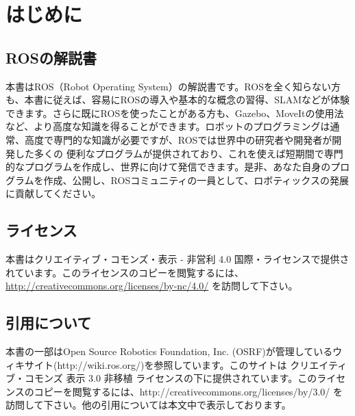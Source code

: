 \chapter*{はじめに}

\section*{ROSの解説書}

本書はROS（Robot Operating System）の解説書です。ROSを全く知らない方も、本書に従えば、容易にROSの導入や基本的な概念の習得、SLAMなどが体験できます。さらに既にROSを使ったことがある方も、Gazebo、MoveItの使用法など、より高度な知識を得ることができます。ロボットのプログラミングは通常、高度で専門的な知識が必要ですが、ROSでは世界中の研究者や開発者が開発した多くの
便利なプログラムが提供されており、これを使えば短期間で専門的なプログラムを作成し、世界に向けて発信できます。是非、あなた自身のプログラムを作成、公開し、ROSコミュニティの一員として、ロボティックスの発展に貢献してください。

\section*{ライセンス}

本書はクリエイティブ・コモンズ・表示 - 非営利 4.0 国際・ライセンスで提供されています。このライセンスのコピーを閲覧するには、 \url{http://creativecommons.org/licenses/by-nc/4.0/} を訪問して下さい。

\section*{引用について}

本書の一部はOpen Source Robotics Foundation, Inc. (OSRF)が管理しているウィキサイト(http://wiki.ros.org/)を参照しています。このサイトは クリエイティブ・コモンズ 表示 3.0 非移植 ライセンスの下に提供されています。このライセンスのコピーを閲覧するには、http://creativecommons.org/licenses/by/3.0/ を訪問して下さい。他の引用については本文中で表示しております。

